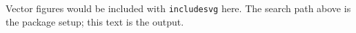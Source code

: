 \documentclass{article}
\begin{document}
Vector figures would be included with \texttt{includesvg} here.
The search path above is the package setup; this text is the output.
\end{document}
